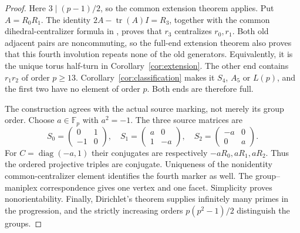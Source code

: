 \documentclass[11pt]{article}
\newcommand{\tr}{\operatorname{tr}}
\begin{document}
\begin{proof}
Here $3\mid(p-1)/2$, so the common extension theorem applies.
Put $A=R_0R_1$. The identity $2A-\tr(A)I=R_3$, together with the
common dihedral-centralizer formula in \cite[Lemma~1]{U}, proves that $r_3$
centralizes $r_0,r_1$. Both old adjacent pairs are noncommuting, so the
full-end extension theorem also proves that this fourth involution
repeats none of the old generators. Equivalently, it is the unique
torus half-turn in Corollary~\ref{cor:extension}. The other end contains
$r_1r_2$ of order $p\ge13$. Corollary~\ref{cor:classification} makes it
$S_4$, $A_5$ or $L(p)$, and the first two have no element of order $p$.
Both ends are therefore full.

The construction agrees with the actual source marking, not merely its
group order. Choose $a\in\mathbb F_p$ with $a^2=-1$. The three source
matrices are
\[
 S_0=\begin{pmatrix}0&1\\-1&0\end{pmatrix},\quad
 S_1=\begin{pmatrix}a&0\\1&-a\end{pmatrix},\quad
 S_2=\begin{pmatrix}-a&0\\0&a\end{pmatrix}.
\]
For $C=\operatorname{diag}(-a,1)$ their conjugates are respectively
$-aR_0,aR_1,aR_2$. Thus the ordered projective triples are conjugate.
Uniqueness of the nonidentity common-centralizer element identifies the
fourth marker as well. The group--maniplex correspondence gives one
vertex and one facet. Simplicity proves nonorientability. Finally,
Dirichlet's theorem supplies infinitely many primes in the progression,
and the strictly increasing orders $p(p^2-1)/2$ distinguish the groups.
\end{proof}
\end{document}
